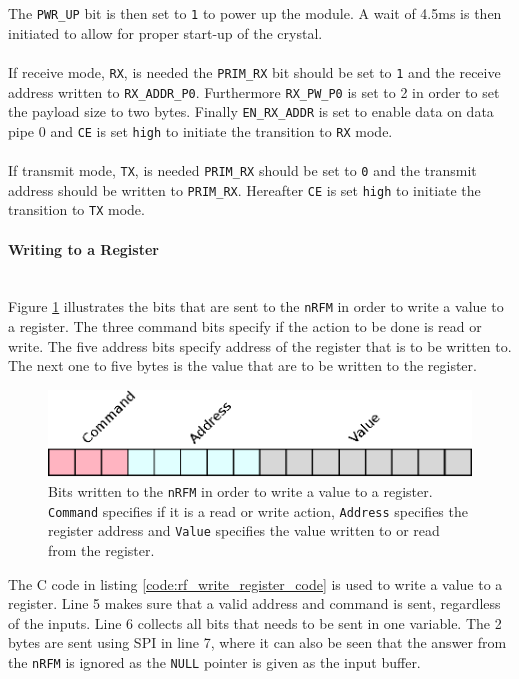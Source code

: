 The \texttt{PWR\_UP} bit is then set to \texttt{1} to power up the module. 
A wait of 4.5ms is then initiated to allow for proper start-up of the crystal.
\\~\\
If receive mode, \texttt{RX}, is needed the \texttt{PRIM\_RX} bit should be set to \texttt{1} and the receive address written to \texttt{RX\_ADDR\_P0}.
Furthermore \texttt{RX\_PW\_P0} is set to 2 in order to set the payload size to two bytes.
Finally \texttt{EN\_RX\_ADDR} is set to enable data on data pipe 0 and \texttt{CE} is set \texttt{high} to initiate the transition to \texttt{RX} mode.
\\~\\
If transmit mode, \texttt{TX}, is needed \texttt{PRIM\_RX} should be set to \texttt{0} and the transmit address should be written to \texttt{PRIM\_RX}.
Hereafter \texttt{CE} is set \texttt{high} to initiate the transition to \texttt{TX} mode.

\paragraph{Writing to a Register} %
\label{par:writing_to_a_register}
~\\
Figure \ref{fig:rw_register} illustrates the bits that are sent to the \texttt{nRFM} in order to write a value to a register. 
The three command bits specify if the action to be done is read or write.
The five address bits specify address of the register that is to be written to. 
The next one to five bytes is the value that are to be written to the register.

\begin{figure}[!h]
	\centering
	\includegraphics[width=.5\linewidth]{graphics/rw_register.eps}
	\caption[Writing bits to a register on nRF24L01.]{Bits written to the \texttt{nRFM} in order to write a value to a register. \texttt{Command} specifies if it is a read or write action, \texttt{Address} specifies the register address and \texttt{Value} specifies the value written to or read from the register.}
	\label{fig:rw_register}
\end{figure}

The C code in listing \ref{code:rf_write_register_code} is used to write a value to a register. 
Line 5 makes sure that a valid address and command is sent, regardless of the inputs.
Line 6 collects all bits that needs to be sent in one variable. 
The 2 bytes are sent using SPI in line 7, where it can also be seen that the answer from the \texttt{nRFM} is ignored as the \texttt{NULL} pointer is given as the input buffer.  

